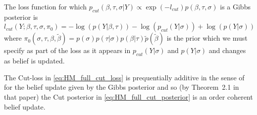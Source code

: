 

The loss function for which $p_{cut}(\beta,\tau, \sigma|Y)\propto \exp(-l_{cut})p(\beta,\tau, \sigma)$ is a Gibbs posterior is
\begin{equation}\label{eq:HM_full_cut_loss}
  l_{cut}(Y; \beta,\tau, \sigma, \pi_0)=-\log(p(Y|\beta,\tau))-\log(p_{cut}(Y|\sigma))+\log(p(Y|\sigma))
\end{equation}
where $\pi_0(\sigma,\tau,\beta,\tilde\beta)=p(\sigma)p(\tau|\sigma)p(\beta|\tau)\tilde p(\tilde\beta)$ is the prior which we must specify as part of the loss as it appears in $p_{cut}(Y|\sigma)$ and $p(Y|\sigma)$ and changes as belief is updated.

\begin{proposition}
  The Cut-loss in \cref{eq:HM_full_cut_loss} is prequentially additive in the sense of \cite{Nicholls2022smi} for the belief update given by the Gibbs posterior and so (by Theorem~2.1 in that paper) the Cut posterior in \cref{eq:HM_full_cut_posterior} is an order coherent belief update.
\end{proposition}

